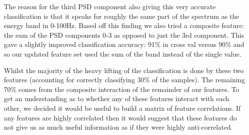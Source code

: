 \documentclass[ %
                    author={Sam Phippen},
                supervisor={Dr. Rafal Bogacz},
                     title={Real time voice activity detectors in noisy personal computing environments},
                  subtitle={},
                    degree={MEng},
                      year={2012} ]{thesis}
\begin{document}
The reason for the third PSD component also giving this very accurate
classification is that it speaks for roughly the same part of the spectrum as
the energy band in 0-100Hz. Based off this finding we also tried a composite
feature: the sum of the PSD components 0-3 as opposed to just the 3rd
component. This gave a slightly improved classification accuracy: 91\% in
cross val versus 90\% and so our updated feature set used the sum of the band
instead of the single value.

Whilst the majority of the heavy lifting of the classification is done by these
two features (accounting for correctly classifying 30\% of the samples). The
remaining 70\% comes from the composite interaction of the remainder of our
features. To get an understanding as to whether any of these features interact
with each other, we decided it would be useful to build a matrix of feature
correlations. If any features are highly correlated then it would suggest that
these features do not give us as much useful information as if they were highly
anti-correlated.
\end{document}
